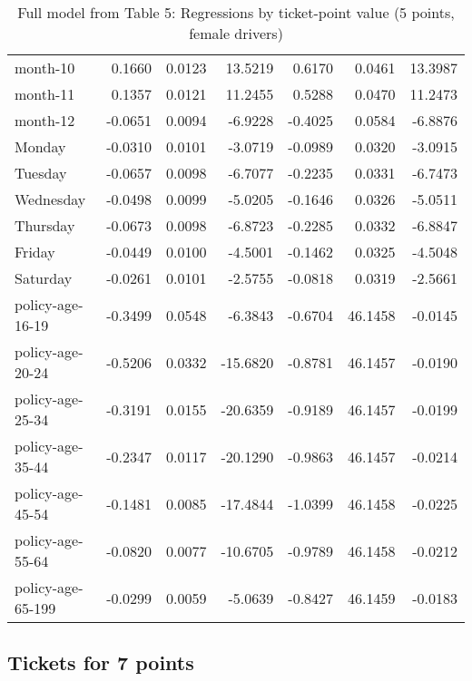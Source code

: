 \documentclass[10pt]{article}
\begin{document}
\begin{table}[ht]
\begin{tabular}{lrrrrrr}
  month-10 & 0.1660 & 0.0123 & 13.5219 & 0.6170 & 0.0461 & 13.3987 \\ 
  month-11 & 0.1357 & 0.0121 & 11.2455 & 0.5288 & 0.0470 & 11.2473 \\ 
  month-12 & -0.0651 & 0.0094 & -6.9228 & -0.4025 & 0.0584 & -6.8876 \\ 
  Monday & -0.0310 & 0.0101 & -3.0719 & -0.0989 & 0.0320 & -3.0915 \\ 
  Tuesday & -0.0657 & 0.0098 & -6.7077 & -0.2235 & 0.0331 & -6.7473 \\ 
  Wednesday & -0.0498 & 0.0099 & -5.0205 & -0.1646 & 0.0326 & -5.0511 \\ 
  Thursday & -0.0673 & 0.0098 & -6.8723 & -0.2285 & 0.0332 & -6.8847 \\ 
  Friday & -0.0449 & 0.0100 & -4.5001 & -0.1462 & 0.0325 & -4.5048 \\ 
  Saturday & -0.0261 & 0.0101 & -2.5755 & -0.0818 & 0.0319 & -2.5661 \\ 
  policy-age-16-19 & -0.3499 & 0.0548 & -6.3843 & -0.6704 & 46.1458 & -0.0145 \\ 
  policy-age-20-24 & -0.5206 & 0.0332 & -15.6820 & -0.8781 & 46.1457 & -0.0190 \\ 
  policy-age-25-34 & -0.3191 & 0.0155 & -20.6359 & -0.9189 & 46.1457 & -0.0199 \\ 
  policy-age-35-44 & -0.2347 & 0.0117 & -20.1290 & -0.9863 & 46.1457 & -0.0214 \\ 
  policy-age-45-54 & -0.1481 & 0.0085 & -17.4844 & -1.0399 & 46.1458 & -0.0225 \\ 
  policy-age-55-64 & -0.0820 & 0.0077 & -10.6705 & -0.9789 & 46.1458 & -0.0212 \\ 
  policy-age-65-199 & -0.0299 & 0.0059 & -5.0639 & -0.8427 & 46.1459 & -0.0183 \\ 
   \hline
\end{tabular}
\caption{Full model from Table 5: Regressions by ticket-point value (5 points, female drivers)} 
\label{tab_5_5_pts_F}
\end{table}


\clearpage
\pagebreak




\subsection{Tickets for 7 points}
\end{document}
